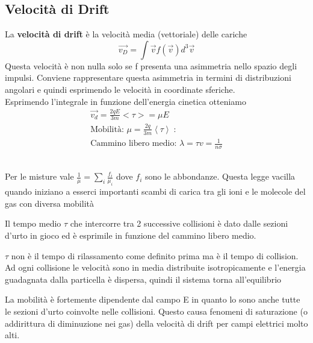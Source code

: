\subsection{Velocità di Drift}
La \textbf{velocità di drift} è la velocità media (vettoriale) delle cariche
$$
\vec{v_D}=\int \vec{v} f(\vec{v})d^3\vec{v}
$$
Questa velocità è non nulla solo se f presenta una asimmetria nello spazio degli impulsi.
Conviene rappresentare questa asimmetria in termini di distribuzioni angolari e quindi esprimendo le velocità in coordinate sferiche.
\\ 
Esprimendo l'integrale in funzione dell'energia cinetica otteniamo 
\[
\begin{gathered}
        \vec{v_d}=\frac{2qE}{3m}<\tau>=\mu E
    \\ 
    \text{Mobilità: }\mu=\frac{2q}{3m} \left<\tau \right>\; :
    \\ 
    \text{Cammino libero medio: }\lambda=\tau v=\frac{1}{n\sigma}  
\end{gathered}  
\]
\begin{remark}[Misture]\hfill \\ 
    Per le misture vale $\frac{1}{\mu}=\sum_i \frac{f_i}{\mu_i}$ dove $f_i$ sono le abbondanze. 
Questa legge vacilla quando iniziano a esserci importanti scambi di carica tra gli ioni e le molecole del gas con diversa mobilità
\end{remark}
Il tempo medio $\tau$ che intercorre tra 2 successive collisioni è dato dalle sezioni d'urto in gioco ed è esprimile in funzione del cammino libero medio.

\begin{note}
    $\tau$ non è il tempo di rilassamento come definito prima ma è il tempo di collision. Ad ogni collisione le velocità sono in media distribuite isotropicamente e l'energia guadagnata dalla particella è dispersa, quindi il sistema torna all'equilibrio
\end{note}
La mobilità è fortemente dipendente dal campo E in quanto lo sono anche tutte le sezioni d'urto coinvolte nelle collisioni. Questo causa fenomeni di saturazione (o addirittura di diminuzione nei gas) della velocità di drift per campi elettrici molto alti.

